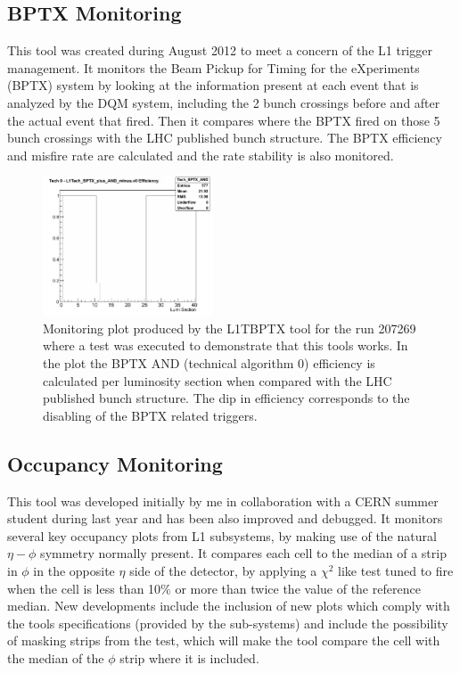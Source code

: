 \subsection{BPTX Monitoring}

This tool was created during August 2012 to meet a concern of the L1 trigger management. It monitors the Beam
Pickup for Timing for the eXperiments (BPTX) system by looking at the information present at each event that 
is analyzed by the DQM system, including the 2 bunch crossings before and after the actual event that fired. Then it 
compares where the BPTX fired on those 5 bunch crossings with the LHC published bunch structure. The BPTX efficiency 
and misfire rate are calculated and the rate stability is also monitored.

\begin{figure}[!htb]
\centering
\includegraphics[width=0.45\textwidth]{Chapter03/L1TOnline/Images/L1TBPTX_Tech_BPTX_AND.png}
\caption{Monitoring plot produced by the L1TBPTX tool for the run 207269 where a test was executed to demonstrate that 
this tools works. In the plot the BPTX AND (technical algorithm 0) efficiency is calculated per luminosity section 
when compared with the LHC published bunch structure. The dip in efficiency corresponds to the disabling of the BPTX 
related triggers.} 
\label{figure_ServiceWork_L1TBPTX}
\end{figure}

\subsection{Occupancy Monitoring}

This tool was developed initially by me in collaboration with a CERN summer student during last year and has been
also improved and debugged. It monitors several key occupancy plots from L1 subsystems, by making use of the natural
$\eta-\phi$ symmetry normally present. It compares each cell to the median of a strip in $\phi$ in the opposite $\eta$
side of the detector, by applying a $\chi^{2}$ like test tuned to fire when the cell is less than 10\% or more than
twice the value of the reference median. New developments include the inclusion of new plots which comply with the
tools specifications (provided by the sub-systems) and include the possibility of masking strips from the test, which 
will make the tool compare the cell with the median of the $\phi$ strip where it is included.

